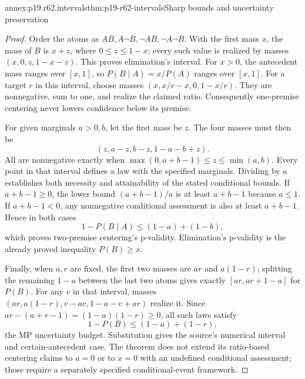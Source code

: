 \begin{annexitem}{annex:p19.r62.intervals}{thm:p19-r62-intervals}{Sharp bounds and uncertainty preservation}
\begin{proof}
Order the atoms as \(AB,A\neg B,\neg AB,\neg A\neg B\).
With the first mass \(x\), the mass of \(B\) is \(x+z\),
where \(0\leq z\leq1-x\); every such value is realized by
masses \((x,0,z,1-x-z)\). This proves elimination's interval.
For \(x>0\), the antecedent mass ranges over \([x,1]\),
so \(P(B\mid A)=x/P(A)\) ranges over \([x,1]\).
For a target \(r\) in this interval, choose masses
\((x,x/r-x,0,1-x/r)\). They are nonnegative, sum to one,
and realize the claimed ratio. Consequently one-premise centering
never lowers confidence below its premise.

For given marginals \(a>0,b\), let the first mass be \(z\).
The four masses must then be
\[
 (z,a-z,b-z,1-a-b+z).
\]
All are nonnegative exactly when
\(\max(0,a+b-1)\leq z\leq\min(a,b)\).
Every point in that interval defines a law with the specified marginals.
Dividing by \(a\) establishes both necessity and attainability of the
stated conditional bounds. If \(a+b-1\geq0\), the lower bound
\((a+b-1)/a\) is at least \(a+b-1\) because \(a\leq1\).
If \(a+b-1<0\), any nonnegative conditional assessment is also at
least \(a+b-1\). Hence in both cases
\[
 1-P(B\mid A)\leq(1-a)+(1-b),
\]
which proves two-premise centering's p-validity. Elimination's p-validity
is the already proved inequality \(P(B)\geq x\).

Finally, when \(a,r\) are fixed, the first two masses are \(ar\)
and \(a(1-r)\); splitting the remaining \(1-a\) between the
last two atoms gives exactly \([ar,ar+1-a]\) for \(P(B)\).
For any \(v\) in that interval, masses
\((ar,a(1-r),v-ar,1-a-v+ar)\) realize it. Since
\(ar-(a+r-1)=(1-a)(1-r)\geq0\), all such laws satisfy
\[
 1-P(B)\leq(1-a)+(1-r),
\]
the MP uncertainty budget. Substitution gives the source's numerical
interval and certain-antecedent case. The theorem does not extend its
ratio-based centering claims to \(a=0\) or to \(x=0\) with an
undefined conditional assessment; those require a separately specified
conditional-event framework.
\end{proof}
\end{annexitem}

